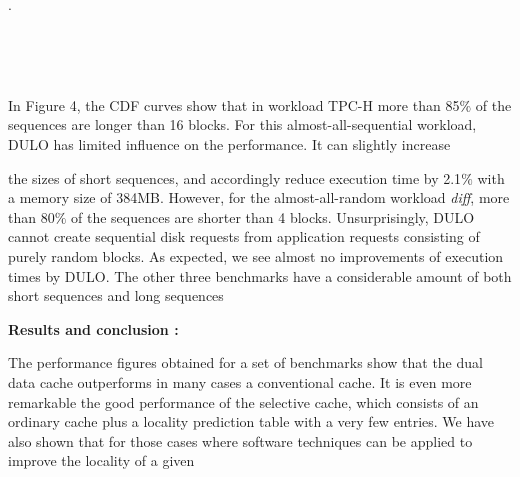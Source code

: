 \documentclass[12pt]{article}
\begin{document}
{\fontsize{10pt}{12.0pt}\selectfont [LXR ].\par}\par





\begin{figure}[H]	\begin{subfigure}		\texttt{[image: ./media/image4.png]}
	\end{subfigure}
~	\begin{subfigure}		\texttt{[image: ./media/image5.png]}
	\end{subfigure}
~
\end{figure}



\setlength{\parskip}{8.04pt}
\par

\setlength{\parskip}{0.0pt}
{\fontsize{10pt}{12.0pt}\selectfont In Figure 4, the CDF curves show that in workload TPC-H more than 85$\%$  of the sequences are longer than 16 blocks. For this almost-all-sequential workload, DULO has limited influence on the performance. It can slightly increase\par}\par

{\fontsize{10pt}{12.0pt}\selectfont the sizes of short sequences, and accordingly reduce execution time by 2.1$\%$  with a memory size of 384MB. However, for the almost-all-random workload \textit{diff}, more than 80$\%$  of the sequences are shorter than 4 blocks. Unsurprisingly, DULO cannot create sequential disk requests from application requests consisting of purely random blocks. As expected, we see almost no improvements of execution times by DULO. The other three benchmarks have a considerable amount of both short sequences and long sequences\par}\par


\vspace{\baselineskip}
\setlength{\parskip}{8.04pt}
{\fontsize{16pt}{19.2pt}\selectfont \textbf{Results and conclusion :}\par}\par

\setlength{\parskip}{0.0pt}
The performance figures obtained for a set of benchmarks show that the dual data cache outperforms in many cases a conventional cache. It is even more remarkable the good performance of the selective cache, which consists of an ordinary cache plus a locality prediction table with a very few entries. We have also shown that for those cases where software techniques can be applied to improve the locality of a given\par
\end{document}
